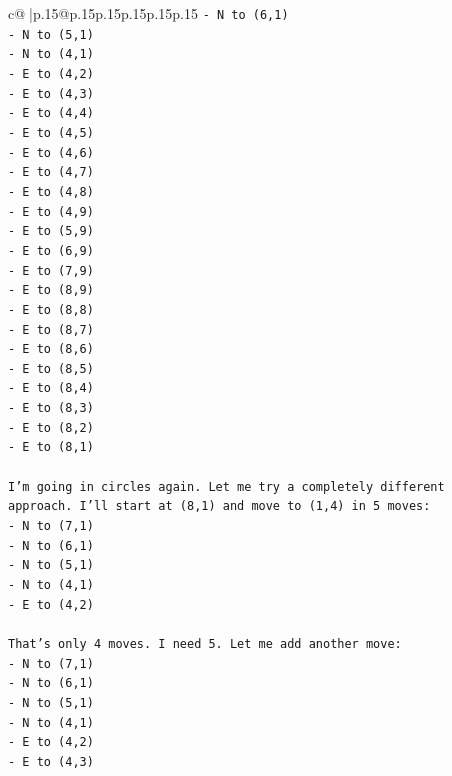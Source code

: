 \documentclass{article}
\begin{document}
{\begin{supertabular}{c@{$\;$}|p{.15\linewidth}@{}p{.15\linewidth}p{.15\linewidth}p{.15\linewidth}p{.15\linewidth}p{.15\linewidth}}
{{{\texttt{{-} N to (6,1)} \\
\texttt{{-} N to (5,1)} \\
\texttt{{-} N to (4,1)} \\
\texttt{{-} E to (4,2)} \\
\texttt{{-} E to (4,3)} \\
\texttt{{-} E to (4,4)} \\
\texttt{{-} E to (4,5)} \\
\texttt{{-} E to (4,6)} \\
\texttt{{-} E to (4,7)} \\
\texttt{{-} E to (4,8)} \\
\texttt{{-} E to (4,9)} \\
\texttt{{-} E to (5,9)} \\
\texttt{{-} E to (6,9)} \\
\texttt{{-} E to (7,9)} \\
\texttt{{-} E to (8,9)} \\
\texttt{{-} E to (8,8)} \\
\texttt{{-} E to (8,7)} \\
\texttt{{-} E to (8,6)} \\
\texttt{{-} E to (8,5)} \\
\texttt{{-} E to (8,4)} \\
\texttt{{-} E to (8,3)} \\
\texttt{{-} E to (8,2)} \\
\texttt{{-} E to (8,1)} \\
\\ 
\texttt{I'm going in circles again. Let me try a completely different approach. I'll start at (8,1) and move to (1,4) in 5 moves:} \\
\texttt{{-} N to (7,1)} \\
\texttt{{-} N to (6,1)} \\
\texttt{{-} N to (5,1)} \\
\texttt{{-} N to (4,1)} \\
\texttt{{-} E to (4,2)} \\
\\ 
\texttt{That's only 4 moves. I need 5. Let me add another move:} \\
\texttt{{-} N to (7,1)} \\
\texttt{{-} N to (6,1)} \\
\texttt{{-} N to (5,1)} \\
\texttt{{-} N to (4,1)} \\
\texttt{{-} E to (4,2)} \\
\texttt{{-} E to (4,3)} \\
}}}
\end{supertabular}}
\end{document}
